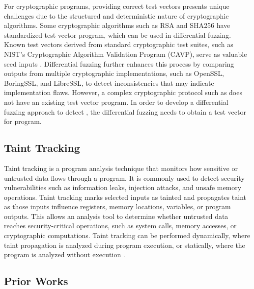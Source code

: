 For cryptographic programs, providing correct test vectors presents unique challenges due to the structured and deterministic nature of cryptographic algorithms. Some cryptographic algorithms such as RSA and SHA256 have standardized test vector program, which can be used in differential fuzzing.  Known test vectors derived from standard cryptographic test suites, such as NIST's Cryptographic Algorithm Validation Program (CAVP), serve as valuable seed inputs \cite{nist_cryptographic_algorithm_validation_program}. Differential fuzzing further enhances this process by comparing outputs from multiple cryptographic implementations, such as OpenSSL, BoringSSL, and LibreSSL, to detect inconsistencies that may indicate implementation flaws. However, a complex cryptographic protocol such as \zkp does not have an existing test vector program. In order to develop a differential fuzzing approach to detect \logicerror, the differential fuzzing needs to obtain a test vector for \zkp program.


\subsection{Taint Tracking}

Taint tracking is a program analysis technique that monitors how sensitive or untrusted data flows through a program. It is commonly used to detect security vulnerabilities such as information leaks, injection attacks, and unsafe memory operations. Taint tracking marks selected inputs as tainted and propagates taint as those inputs influence registers, memory locations, variables, or program outputs. This allows an analysis tool to determine whether untrusted data reaches security-critical operations, such as system calls, memory accesses, or cryptographic computations. Taint tracking can be performed dynamically, where taint propagation is analyzed during program execution, or statically, where the program is analyzed without execution \cite{yan2017sok}.


\subsection{Prior Works}
\label{subsec:greybox-prior_work}

